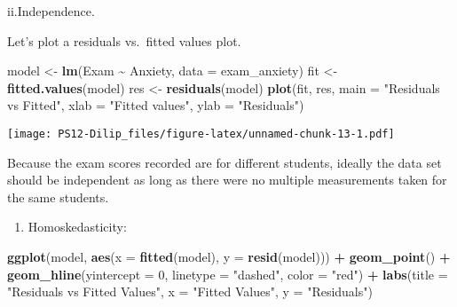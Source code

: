 \documentclass[
]{article}
\newenvironment{Shaded}{\begin{snugshade}}{\end{snugshade}}
\newcommand{\AttributeTok}[1]{\textcolor[rgb]{0.13,0.29,0.53}{#1}}
\newcommand{\DecValTok}[1]{\textcolor[rgb]{0.00,0.00,0.81}{#1}}
\newcommand{\FunctionTok}[1]{\textcolor[rgb]{0.13,0.29,0.53}{\textbf{#1}}}
\newcommand{\NormalTok}[1]{#1}
\newcommand{\OtherTok}[1]{\textcolor[rgb]{0.56,0.35,0.01}{#1}}
\newcommand{\SpecialCharTok}[1]{\textcolor[rgb]{0.81,0.36,0.00}{\textbf{#1}}}
\newcommand{\StringTok}[1]{\textcolor[rgb]{0.31,0.60,0.02}{#1}}
\providecommand{\tightlist}{%
  \setlength{\itemsep}{0pt}\setlength{\parskip}{0pt}}
\begin{document}
ii.Independence.

Let's plot a residuals vs.~fitted values plot.

\begin{Shaded}
\begin{Highlighting}[]
\NormalTok{model }\OtherTok{\textless{}{-}} \FunctionTok{lm}\NormalTok{(Exam }\SpecialCharTok{\textasciitilde{}}\NormalTok{ Anxiety, }\AttributeTok{data =}\NormalTok{ exam\_anxiety)}
\NormalTok{fit }\OtherTok{\textless{}{-}} \FunctionTok{fitted.values}\NormalTok{(model)}
\NormalTok{res }\OtherTok{\textless{}{-}} \FunctionTok{residuals}\NormalTok{(model)}
\FunctionTok{plot}\NormalTok{(fit, res, }\AttributeTok{main =} \StringTok{"Residuals vs Fitted"}\NormalTok{, }\AttributeTok{xlab =} \StringTok{"Fitted values"}\NormalTok{, }\AttributeTok{ylab =} \StringTok{"Residuals"}\NormalTok{)}
\end{Highlighting}
\end{Shaded}

\texttt{[image: PS12-Dilip\_files/figure-latex/unnamed-chunk-13-1.pdf]}

Because the exam scores recorded are for different students, ideally the
data set should be independent as long as there were no multiple
measurements taken for the same students.

\begin{enumerate}
\def\labelenumi{\roman{enumi}.}
\setcounter{enumi}{2}
\tightlist
\item
  Homoskedasticity:
\end{enumerate}

\begin{Shaded}
\begin{Highlighting}[]
\FunctionTok{ggplot}\NormalTok{(model, }\FunctionTok{aes}\NormalTok{(}\AttributeTok{x =} \FunctionTok{fitted}\NormalTok{(model), }\AttributeTok{y =} \FunctionTok{resid}\NormalTok{(model))) }\SpecialCharTok{+}
  \FunctionTok{geom\_point}\NormalTok{() }\SpecialCharTok{+}
  \FunctionTok{geom\_hline}\NormalTok{(}\AttributeTok{yintercept =} \DecValTok{0}\NormalTok{, }\AttributeTok{linetype =} \StringTok{"dashed"}\NormalTok{, }\AttributeTok{color =} \StringTok{"red"}\NormalTok{) }\SpecialCharTok{+}
  \FunctionTok{labs}\NormalTok{(}\AttributeTok{title =} \StringTok{"Residuals vs Fitted Values"}\NormalTok{,}
       \AttributeTok{x =} \StringTok{"Fitted Values"}\NormalTok{,}
       \AttributeTok{y =} \StringTok{"Residuals"}\NormalTok{)}
\end{Highlighting}
\end{Shaded}
\end{document}
